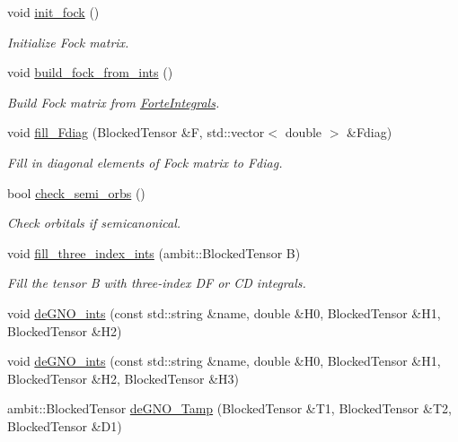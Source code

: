 \begin{DoxyCompactItemize}
void \mbox{\hyperlink{classforte_1_1_s_a_d_s_r_g_a174c0908b6d5b6b81d5f88b6a7dbe683}{init\+\_\+fock}} ()
\begin{DoxyCompactList}\small\item\em Initialize Fock matrix. \end{DoxyCompactList}\item 
void \mbox{\hyperlink{classforte_1_1_s_a_d_s_r_g_a90206e749419b4cf04bd04d342cdf880}{build\+\_\+fock\+\_\+from\+\_\+ints}} ()
\begin{DoxyCompactList}\small\item\em Build Fock matrix from \mbox{\hyperlink{classforte_1_1_forte_integrals}{Forte\+Integrals}}. \end{DoxyCompactList}\item 
void \mbox{\hyperlink{classforte_1_1_s_a_d_s_r_g_ad44eeb8422c9f0e7b158349cee1c971c}{fill\+\_\+\+Fdiag}} (Blocked\+Tensor \&F, std\+::vector$<$ double $>$ \&Fdiag)
\begin{DoxyCompactList}\small\item\em Fill in diagonal elements of Fock matrix to Fdiag. \end{DoxyCompactList}\item 
bool \mbox{\hyperlink{classforte_1_1_s_a_d_s_r_g_a559f46dae79f94ae377be53b4602db15}{check\+\_\+semi\+\_\+orbs}} ()
\begin{DoxyCompactList}\small\item\em Check orbitals if semicanonical. \end{DoxyCompactList}\item 
void \mbox{\hyperlink{classforte_1_1_s_a_d_s_r_g_aa9421ef247f2b3fdfd7b8fea5990b9b2}{fill\+\_\+three\+\_\+index\+\_\+ints}} (ambit\+::\+Blocked\+Tensor B)
\begin{DoxyCompactList}\small\item\em Fill the tensor B with three-\/index DF or CD integrals. \end{DoxyCompactList}\item 
void \mbox{\hyperlink{classforte_1_1_s_a_d_s_r_g_a46976ae7a4ec1a226f47739d22b46265}{de\+G\+N\+O\+\_\+ints}} (const std\+::string \&name, double \&H0, Blocked\+Tensor \&H1, Blocked\+Tensor \&H2)
\item 
void \mbox{\hyperlink{classforte_1_1_s_a_d_s_r_g_ad8d9baf7113dd3c255284977ce563278}{de\+G\+N\+O\+\_\+ints}} (const std\+::string \&name, double \&H0, Blocked\+Tensor \&H1, Blocked\+Tensor \&H2, Blocked\+Tensor \&H3)
\item 
ambit\+::\+Blocked\+Tensor \mbox{\hyperlink{classforte_1_1_s_a_d_s_r_g_a3441652004bce10f0d44003821814a3a}{de\+G\+N\+O\+\_\+\+Tamp}} (Blocked\+Tensor \&T1, Blocked\+Tensor \&T2, Blocked\+Tensor \&D1)

\end{DoxyCompactItemize}

